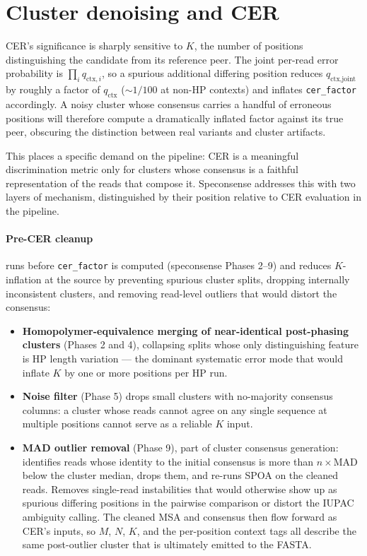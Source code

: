 \documentclass[11pt]{article}
\begin{document}
\section{Cluster denoising and CER}
\label{sec:denoising}

CER's significance is sharply sensitive to $K$, the number of positions
distinguishing the candidate from its reference peer. The joint per-read error
probability is $\prod_i q_{\text{ctx},i}$, so a spurious additional differing
position reduces $q_\text{ctx,joint}$ by roughly a factor of $q_\text{ctx}$
($\sim\!1/100$ at non-HP contexts) and inflates \texttt{cer\_factor}
accordingly. A noisy cluster whose consensus carries a handful of erroneous
positions will therefore compute a dramatically inflated factor against its
true peer, obscuring the distinction between real variants and cluster
artifacts.

This places a specific demand on the pipeline: CER is a meaningful
discrimination metric only for clusters whose consensus is a faithful
representation of the reads that compose it. Speconsense addresses this with
two layers of mechanism, distinguished by their position relative to CER
evaluation in the pipeline.

\paragraph{Pre-CER cleanup} runs before \texttt{cer\_factor} is computed
(speconsense Phases 2--9) and reduces $K$-inflation at the source by
preventing spurious cluster splits, dropping internally inconsistent
clusters, and removing read-level outliers that would distort the
consensus:

\begin{itemize}
\item \textbf{Homopolymer-equivalence merging of near-identical post-phasing
clusters} (Phases 2 and 4), collapsing splits whose only distinguishing
feature is HP length variation --- the dominant systematic error mode that
would inflate $K$ by one or more positions per HP run.

\item \textbf{Noise filter} (Phase 5) drops small clusters with no-majority
consensus columns: a cluster whose reads cannot agree on any single sequence
at multiple positions cannot serve as a reliable $K$ input.

\item \textbf{MAD outlier removal} (Phase 9), part of cluster consensus
generation: identifies reads whose identity to the initial consensus is
more than $n\!\times\!\text{MAD}$ below the cluster median, drops them,
and re-runs SPOA on the cleaned reads. Removes single-read instabilities
that would otherwise show up as spurious differing positions in the
pairwise comparison or distort the IUPAC ambiguity calling. The cleaned
MSA and consensus then flow forward as CER's inputs, so $M$, $N$, $K$, and
the per-position context tags all describe the same post-outlier cluster
that is ultimately emitted to the FASTA.
\end{itemize}
\end{document}
